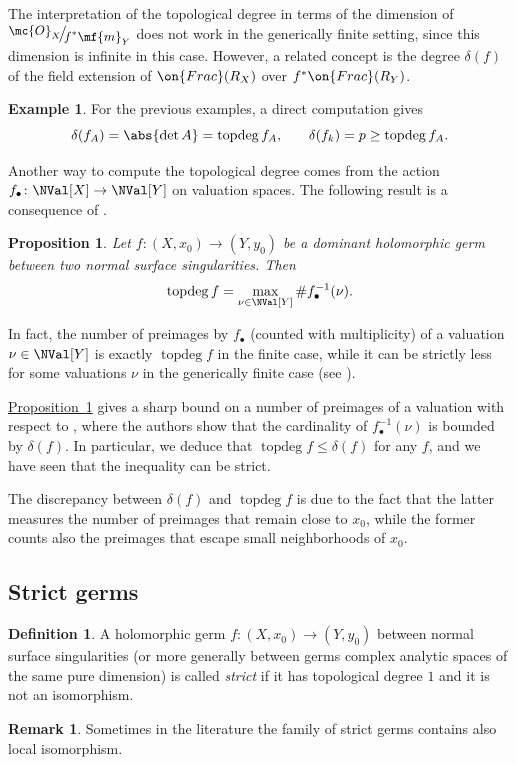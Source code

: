 \documentclass[11 pt, twoside, a4paper]{amsart}
\newcommand{\topdeg}{\operatorname{topdeg}}
\def\nfrac#1#2{%
    \raise.5ex\hbox{\small{$#1$}}%
    \kern-.18em\big/\kern-.2em%
    \lower.5ex\hbox{\small{$#2$}}}
\newtheorem{prop}[thm]{Proposition}
\theoremstyle{definition}
\newtheorem{rem}[thm]{Remark}
\newtheorem{defi}[thm]{Definition}
\newtheorem{ex}[thm]{Example}
\theoremstyle{definition}
\newcommand{\Frac}{\on{Frac}}					%
\newcommand{\refprop}[1]{\hyperref[prop:#1]{Proposition~\ref*{prop:#1}}}
\begin{document}
The interpretation of the topological degree in terms of the dimension of $\nfrac{\mc{O}_X}{f^*\mf{m}_Y}$ does not work in the generically finite setting, since this dimension is infinite in this case.
However, a related concept is the degree $\delta(f)$ of the field extension of $\Frac (R_X)$ over $f^* \Frac(R_Y)$.

\begin{ex}
For the previous examples, a direct computation gives
\[
\delta(f_A)=\abs{\det A} = \topdeg f_A\text{,}
\qquad
\delta(f_k)=p \geq \topdeg f_A\text{.}
\]
\end{ex}

Another way to compute the topological degree comes from the action $f_\bullet \colon \NVal[X] \to \NVal[Y]$ on valuation spaces.
The following result is a consequence of \cite[Theorem  4.18]{gignac-ruggiero:locdynnoninvnormsurfsing}.


\begin{prop}%
\label{prop:topdegboundpreimages}
Let $f \colon (X,x_0) \to (Y,y_0)$ be a dominant holomorphic germ between two normal surface singularities.
Then
\[
\topdeg{f}= \max_{\nu \in \NVal[Y]} \# f_\bullet^{-1}(\nu)\text{.}
\]
\end{prop}
In fact, the number of preimages by $f_\bullet$ (counted with multiplicity) of a valuation $\nu \in \NVal[Y]$ is exactly $\topdeg f$ in the finite case, while it can be strictly less for some valuations $\nu$ in the generically finite case (see \cite[Remark 4.19]{gignac-ruggiero:locdynnoninvnormsurfsing}).

\refprop{topdegboundpreimages} gives a sharp bound on a number of preimages of a valuation with respect to \cite[Proposition 2.4]{favre-jonsson:eigenval}, where the authors show that the cardinality of $f_\bullet^{-1}(\nu)$ is bounded by $\delta(f)$.
In particular, we deduce that $\topdeg f \leq \delta(f)$ for any $f$, and we have seen that the inequality can be strict.

The discrepancy between $\delta(f)$ and $\topdeg f$ is due to the fact that the latter measures the number of preimages that remain close to $x_0$, while the former counts also the preimages that escape small neighborhoods of $x_0$.


\subsection{Strict germs}

\begin{defi}
A holomorphic germ $f \colon (X,x_0) \to (Y,y_0)$ between normal surface singularities (or more generally between germs complex analytic spaces of the same pure dimension) is called \emph{strict} if it has topological degree $1$ and it is not an isomorphism.
\end{defi}
\begin{rem}
Sometimes in the literature the family of strict germs contains also local isomorphism.
\end{rem}
\end{document}
